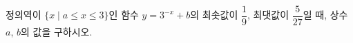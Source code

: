 정의역이 $\{x \mid a\le x\le 3\}$인 함수 $y=3^{-x}+b$의 최솟값이 $\dfrac{1}{9}$, 최댓값이 $\dfrac{5}{27}$일 때, 상수 $a$, $b$의 값을 구하시오.
